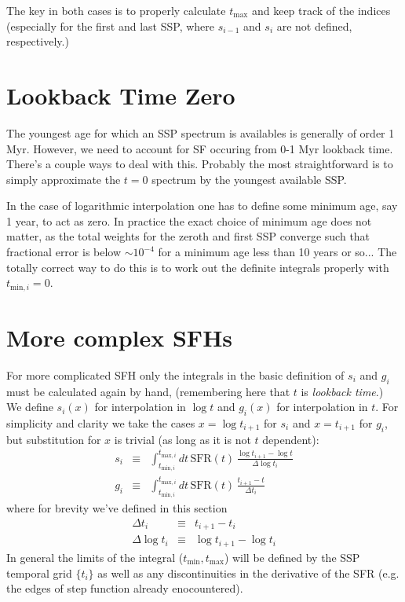 \documentclass[12pt, letterpaper, preprint]{aastex}
\newcommand{\tmin}[1][]{t_{\mathrm{min} #1}}
\newcommand{\tmax}[1][]{t_{\mathrm{max} #1}}
\newcommand{\dlt}{\Delta\log t_i}
\newcommand{\dt}{\Delta t_i}
\newcommand{\tintegral}{\int_{\tmin[,i]}^{\tmax[,i]} dt}
\begin{document}
The key in both cases is to properly calculate $\tmax$ and keep track of the indices 
(especially for the first and last SSP, where $s_{i-1}$ and $s_i$ are not defined, respectively.)  

\section{Lookback Time Zero}
The youngest age for which an SSP spectrum is availables is generally of order 1 Myr.  
However, we need to account for SF occuring from 0-1 Myr lookback time.
There's a couple ways to deal with this.  
Probably the most straightforward is to simply approximate the $t=0$ spectrum by the youngest available SSP.

In the case of logarithmic interpolation one has to define some minimum age, say 1 year, to act as zero.
In practice the exact choice of minimum age does not matter, 
as the total weights for the zeroth and first SSP converge such that fractional error is below $\sim 10^{-4}$ for a minimum age less than 10 years or so...
The totally correct way to do this is to work out the definite integrals properly with $\tmin[,i]=0$.


\section{More complex SFHs}
For more complicated SFH only the integrals in the basic definition of $s_i$ and $g_i$ must be calculated again by hand, 
(remembering here that $t$ is \emph{lookback time}.)
We define $s_i(x)$ for interpolation in $\log t$ and $g_i(x)$ for interpolation in $t$.  
For simplicity and clarity we take the cases $x = \log t_{i+1}$ for $s_i$ and $x = t_{i+1}$ for $g_i$, 
but substitution for $x$ is trivial (as long as it is not $t$ dependent):
\begin{eqnarray}
s_i & \equiv & \tintegral \, \mathrm{SFR}(t) \, \frac{\log t_{i+1} - \log t}{\dlt} \\
g_i & \equiv & \tintegral \, \mathrm{SFR}(t) \, \frac{t_{i+1} - t}{\dt}
\end{eqnarray}
where for brevity we've defined in this section
\begin{eqnarray}
\dt & \equiv & t_{i+1} -  t_i  \nonumber \\
\dlt & \equiv & \log t_{i+1} - \log t_i \nonumber
\end{eqnarray}
In general the limits of the integral ($\tmin, \tmax$) will be defined by the SSP temporal grid $\{t_i\}$ as well as any discontinuities in the derivative of the SFR (e.g. the edges of step function already enocountered).
\end{document}
